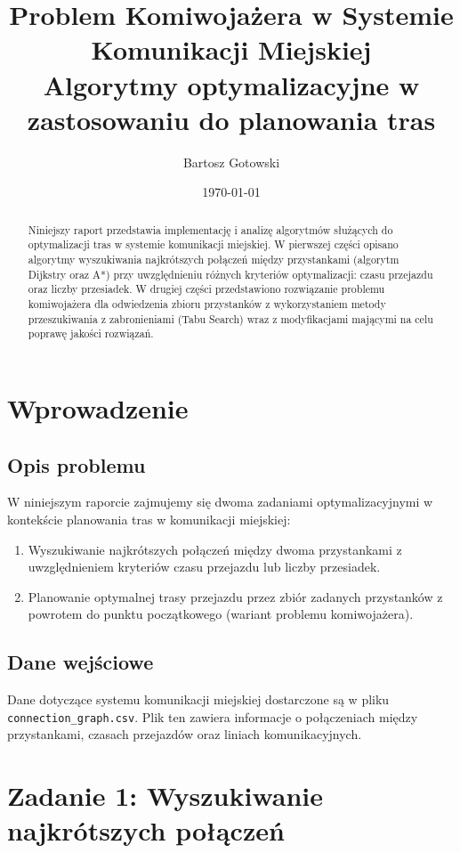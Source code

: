 \documentclass[12pt,a4paper]{article}
\title{\LARGE \textbf{Problem Komiwojażera w Systemie Komunikacji Miejskiej}\\
\large Algorytmy optymalizacyjne w zastosowaniu do planowania tras}
\author{Bartosz Gotowski}
\date{\today}
\begin{document}
\maketitle

\begin{abstract}
    Niniejszy raport przedstawia implementację i analizę algorytmów służących do optymalizacji tras w systemie komunikacji miejskiej. W pierwszej części opisano algorytmy wyszukiwania najkrótszych połączeń między przystankami (algorytm Dijkstry oraz A*) przy uwzględnieniu różnych kryteriów optymalizacji: czasu przejazdu oraz liczby przesiadek. W drugiej części przedstawiono rozwiązanie problemu komiwojażera dla odwiedzenia zbioru przystanków z wykorzystaniem metody przeszukiwania z zabronieniami (Tabu Search) wraz z modyfikacjami mającymi na celu poprawę jakości rozwiązań.
\end{abstract}

\tableofcontents
\newpage

\section{Wprowadzenie}
\subsection{Opis problemu}
W niniejszym raporcie zajmujemy się dwoma zadaniami optymalizacyjnymi w kontekście planowania tras w komunikacji miejskiej:
\begin{enumerate}
    \item Wyszukiwanie najkrótszych połączeń między dwoma przystankami z uwzględnieniem kryteriów czasu przejazdu lub liczby przesiadek.
    \item Planowanie optymalnej trasy przejazdu przez zbiór zadanych przystanków z powrotem do punktu początkowego (wariant problemu komiwojażera).
\end{enumerate}

\subsection{Dane wejściowe}
Dane dotyczące systemu komunikacji miejskiej dostarczone są w pliku \texttt{connection\_graph.csv}. Plik ten zawiera informacje o połączeniach między przystankami, czasach przejazdów oraz liniach komunikacyjnych.

\section{Zadanie 1: Wyszukiwanie najkrótszych połączeń}
\end{document}

